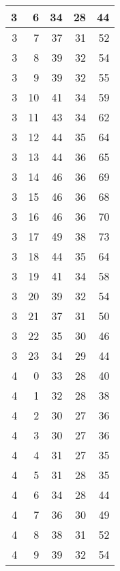 \begin{longtable}{|r|r|r|r|r|}
    \hline
    3     & 6     & 34    & 28    & 44 \\
    \hline
    3     & 7     & 37    & 31    & 52 \\
    \hline
    3     & 8     & 39    & 32    & 54 \\
    \hline
    3     & 9     & 39    & 32    & 55 \\
    \hline
    3     & 10    & 41    & 34    & 59 \\
    \hline
    3     & 11    & 43    & 34    & 62 \\
    \hline
    3     & 12    & 44    & 35    & 64 \\
    \hline
    3     & 13    & 44    & 36    & 65 \\
    \hline
    3     & 14    & 46    & 36    & 69 \\
    \hline
    3     & 15    & 46    & 36    & 68 \\
    \hline
    3     & 16    & 46    & 36    & 70 \\
    \hline
    3     & 17    & 49    & 38    & 73 \\
    \hline
    3     & 18    & 44    & 35    & 64 \\
    \hline
    3     & 19    & 41    & 34    & 58 \\
    \hline
    3     & 20    & 39    & 32    & 54 \\
    \hline
    3     & 21    & 37    & 31    & 50 \\
    \hline
    3     & 22    & 35    & 30    & 46 \\
    \hline
    3     & 23    & 34    & 29    & 44 \\
    \hline
    4     & 0     & 33    & 28    & 40 \\
    \hline
    4     & 1     & 32    & 28    & 38 \\
    \hline
    4     & 2     & 30    & 27    & 36 \\
    \hline
    4     & 3     & 30    & 27    & 36 \\
    \hline
    4     & 4     & 31    & 27    & 35 \\
    \hline
    4     & 5     & 31    & 28    & 35 \\
    \hline
    4     & 6     & 34    & 28    & 44 \\
    \hline
    4     & 7     & 36    & 30    & 49 \\
    \hline
    4     & 8     & 38    & 31    & 52 \\
    \hline
    4     & 9     & 39    & 32    & 54 \\

\end{longtable}
